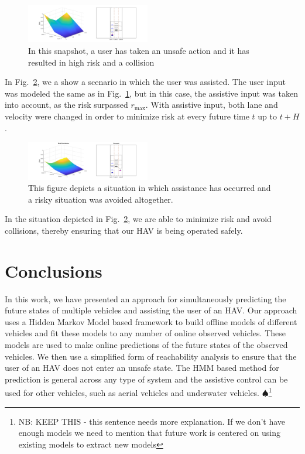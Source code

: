 \documentclass[letterpaper, 10 pt, conference]{ieeeconf}  %
\newcommand\NB[1]{$\spadesuit$\footnote{NB: #1}}
\begin{document}
\begin{figure}[ht] 
    \includegraphics[width=0.48\textwidth]{fig/noassist.png} 
    \caption{In this snapshot, a user has taken an unsafe action and it has resulted in high risk and a collision} \label{fig:noassist} 
\end{figure}

In Fig.~\ref{fig:assist}, we a show a scenario in which the user was assisted. The user input was modeled the same as in Fig.~\ref{fig:noassist}, but in this case, the assistive input was taken into account, as the risk surpassed $r_{\max}$. With assistive input, both lane and velocity were changed in order to minimize risk at every future time $t$ up to $t+H$.

\begin{figure}[ht] 
    \includegraphics[width=0.48\textwidth]{fig/assist.png} 
    \caption{This figure depicts a situation in which assistance has occurred and a risky situation was avoided altogether.} \label{fig:assist}
\end{figure}

 In the situation depicted in Fig.~\ref{fig:assist}, we are able to minimize risk and avoid collisions, thereby ensuring that our HAV is being operated safely.


\section{Conclusions} \label{sec:concs}
In this work, we have presented an approach for simultaneously predicting the future states of multiple vehicles and assisting the user of an HAV. Our approach uses a Hidden Markov Model based framework to build offline models of different vehicles and fit these models to any number of online observed vehicles. These models are used to make online predictions of the future states of the observed vehicles. We then use a simplified form of reachability analysis to ensure that the user of an HAV does not enter an unsafe state. The HMM based method for prediction is general across any type of system and the assistive control can be used for other vehicles, such as aerial vehicles and underwater vehicles.
\NB{KEEP THIS - this sentence needs more explanation. If we don't have enough models we need to mention that future work is centered on using existing models to extract new models}
\end{document}
